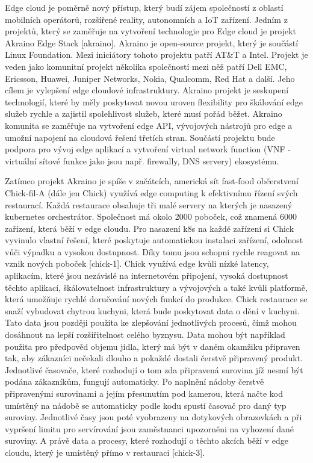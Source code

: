      Edge cloud je poměrně nový přístup, který budí zájem společností z oblastí mobilních operátorů, rozšířené reality, autonomních a IoT zařízení. Jedním z projektů, který se zaměřuje na vytvoření technologie pro Edge cloud je projekt Akraino Edge Stack [akraino]. Akraino je open-source projekt, který je součástí Linux Foundation. Mezi iniciátory tohoto projektu patří AT&T a Intel. Projekt je veden jako komunitní projekt několika společností mezi něž patří Dell EMC, Ericsson, Huawei, Juniper Networks, Nokia, Qualcomm, Red Hat a další. Jeho cílem je vylepšení edge cloudové infrastruktury. Akraino projekt je seskupení technologií, které by měly poskytovat novou uroven flexibility pro škálování edge služeb rychle a zajistil spolehlivost služeb, které musí pořád běžet. Akraino komunita se zaměřuje na vytvoření edge API, vývojových nástrojů pro edge a umožní napojení na cloudová řešení třetích stran. Součástí projektu bude podpora pro vývoj edge aplikací a vytvoření virtual network function (VNF - virtuální sítové funkce jako jsou např. firewally, DNS servery) ekosystému. \par
         Zatímco projekt Akraino je spíše v začátcích, americká sít fast-food občerstvení Chick-fil-A (dále jen Chick) využívá edge computing k efektivnímu řízení svých restaurací. Každá restaurace obsahuje tři malé servery na kterých je nasazený kubernetes orchestrátor. Společnost má okolo 2000 poboček, což znamená 6000 zařízení, která běží v edge cloudu. Pro nasazení k8s na každé zařízení si Chick vyvinulo vlastní řešení, které poskytuje automatickou instalaci zařízení, odolnost vůči výpadku a vysokou dostupnost. Díky tomu jsou schopni rychle reagovat na vznik nových poboček [chick-1]. Chick využívá edge kvůli nízké latency, aplikacím, které jsou nezávislé na internetovém připojení, vysoká dostupnost těchto aplikací, škálovatelnost infrastruktury a vývojových a také kvůli platformě, která umožňuje rychlé doručování nových funkcí do produkce. Chick restaurace se snaží vybudovat chytrou kuchyni, která bude poskytovat data o dění v kuchyni. Tato data jsou později použita ke zlepšování jednotlivých procesů, čímž mohou dosáhnout na lepší rozšiřitelnost celého byznysu. Data mohou být například použita pro předpověd objemu jídla, který má být v daném okamžiku připraven tak, aby zákazníci nečekali dlouho a pokaždé dostali čerstvě připravený produkt. Jednotlivé časovače, které rozhodují o tom zda připravená surovina jíž nesmí být podána zákazníkům, fungují automaticky. Po naplnění nádoby čerstvě připravenými surovinami a jejím přesunutím pod kamerou, která načte kod umístěný na nádobě se automaticky podle kodu spustí časovač pro daný typ suroviny. Jednotlivé časy jsou poté vyobrazeny na dotykových obrazovkách a při vypršení limitu pro servírování jsou zaměstnanci upozorněni na vyhození dané suroviny. A právě data a procesy, které rozhodují o těchto akcích běží v edge cloudu, který je umístěný přímo v restauraci [chick-3].\par
